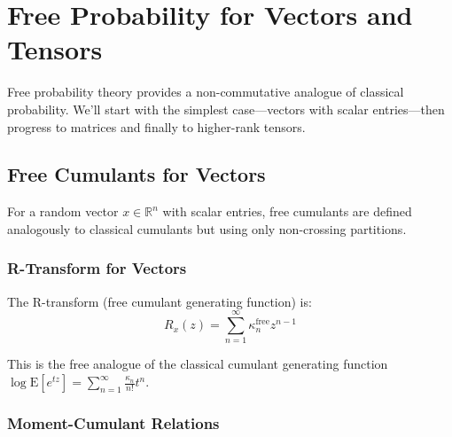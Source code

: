 \section{Free Probability for Vectors and Tensors}

Free probability theory provides a non-commutative analogue of classical probability. We'll start with the simplest case—vectors with scalar entries—then progress to matrices and finally to higher-rank tensors.

\subsection{Free Cumulants for Vectors}

For a random vector $x \in \mathbb{R}^n$ with scalar entries, free cumulants are defined analogously to classical cumulants but using only non-crossing partitions.

\subsubsection{R-Transform for Vectors}

The R-transform (free cumulant generating function) is:
\[
   R_x(z) = \sum_{n=1}^{\infty} \kappa_n^{\text{free}} z^{n-1}
\]

This is the free analogue of the classical cumulant generating function $\log \mathrm{E}[e^{tz}] = \sum_{n=1}^{\infty} \frac{\kappa_n}{n!} t^n$.

\subsubsection{Moment-Cumulant Relations}

